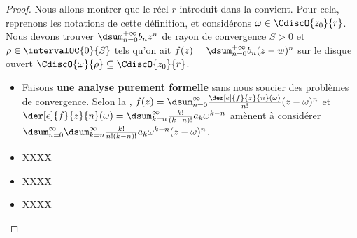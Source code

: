 \begin{proof}
    Nous allons montrer que le réel $r$ introduit dans la  convient.
    Pour cela, reprenons les notations de cette définition,
    et considérons $\omega \in \CdiscO{z_0}{r}$.
    Nous devons trouver $\dsum_{n = 0}^{+\infty} b_n z^n$ de rayon de convergence $S > 0$
	et
	$\rho \in \intervalOC{0}{S}$
	tels qu'on ait
	$f(z) = \dsum_{n = 0}^{+\infty} b_n (z - w)^n$
	sur le disque ouvert $\CdiscO{\omega}{\rho} \subseteq \CdiscO{z_0}{r}$.
	\begin{itemize}
		\item Faisons \textbf{une analyse purement formelle} sans nous soucier des problèmes de convergence.
		Selon la ,
		$f(z) = \dsum_{n = 0}^{\infty} \frac{\der[e]{f}{z}{n}(\omega)}{n!} (z - \omega)^n$
		et
		$\der[e]{f}{z}{n}(\omega) = \dsum_{k = n}^{\infty} \frac{k!}{(k-n)!} a_k \omega^{k - n}$
		amènent à considérer
		$\dsum_{n = 0}^{\infty} \dsum_{k = n}^{\infty} \frac{k!}{n! (k-n)!} a_k \omega^{k - n} (z - \omega)^n$.
	

		\item XXXX
	

		\item XXXX
	

		\item XXXX
	\end{itemize}
\end{proof}




%
%
%
%
%
%
%
%
